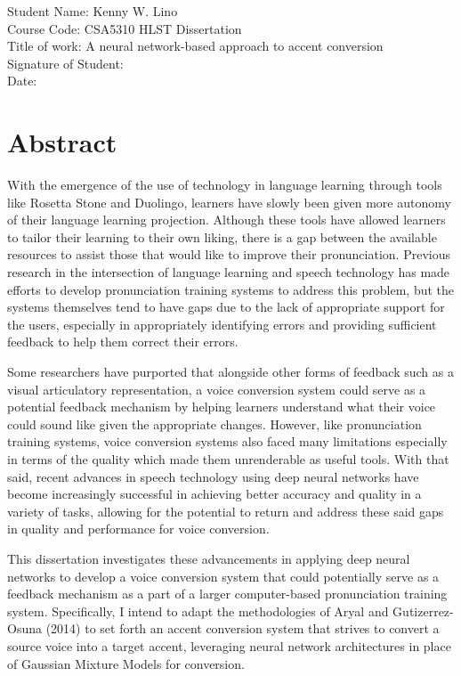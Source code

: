 \documentclass
[
    a4paper,
    twoside,
    12pt
]
{report}
\begin{document}
       \vspace*{1.5cm}
	     Student Name: Kenny W. Lino \\
       Course Code: CSA5310 HLST Dissertation \\
       Title of work: A neural network-based approach to accent conversion \\

       \vspace*{1.0cm}
       Signature of Student: \\

       \vspace*{1.0cm}
       Date:

\newpage
\section*{Abstract}

With the emergence of the use of technology in language learning through
tools like Rosetta Stone and Duolingo, learners have slowly been given
more autonomy of their language learning projection. Although these
tools have allowed learners to tailor their learning to their own
liking, there is a gap between the available resources to assist those
that would like to improve their pronunciation. Previous research in the
intersection of language learning and speech technology has made efforts
to develop pronunciation training systems to address this problem, but
the systems themselves tend to have gaps due to the lack of appropriate
support for the users, especially in appropriately identifying errors
and providing sufficient feedback to help them correct their errors.

Some researchers have purported that alongside other forms of feedback
such as a visual articulatory representation, a voice conversion system
could serve as a potential feedback mechanism by helping learners
understand what their voice could sound like given the appropriate
changes. However, like pronunciation training systems, voice conversion
systems also faced many limitations especially in terms of the quality
which made them unrenderable as useful tools. With that said, recent
advances in speech technology using deep neural networks have become
increasingly successful in achieving better accuracy and quality in a
variety of tasks, allowing for the potential to return and address these
said gaps in quality and performance for voice conversion.

This dissertation investigates these advancements in applying deep
neural networks to develop a voice conversion system that could
potentially serve as a feedback mechanism as a part of a larger
computer-based pronunciation training system. Specifically, I intend to
adapt the methodologies of Aryal and Gutizerrez-Osuna (2014) to set
forth an accent conversion system that strives to convert a source voice
into a target accent, leveraging neural network architectures in place
of Gaussian Mixture Models for conversion.
\cleardoublepage
\tableofcontents
{}
\clearpage
\listoffigures
{}
\end{document}
